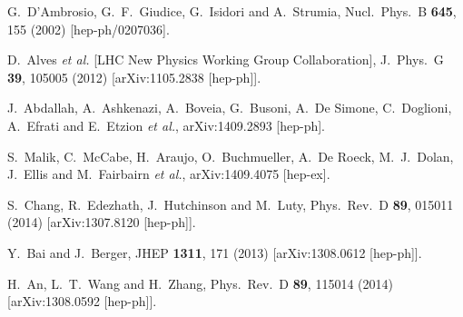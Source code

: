 \begin{thebibliography}{90}


  G.~D'Ambrosio, G.~F.~Giudice, G.~Isidori and A.~Strumia,
  Nucl.\ Phys.\ B {\bf 645}, 155 (2002)
  [hep-ph/0207036].
  

  D.~Alves {\it et al.}  [LHC New Physics Working Group Collaboration],
  J.\ Phys.\ G {\bf 39}, 105005 (2012)
  [arXiv:1105.2838 [hep-ph]].
  
  

  J.~Abdallah, A.~Ashkenazi, A.~Boveia, G.~Busoni, A.~De Simone, C.~Doglioni, A.~Efrati and E.~Etzion {\it et al.},
  arXiv:1409.2893 [hep-ph].
  
  S.~Malik, C.~McCabe, H.~Araujo, O.~Buchmueller, A.~De Roeck, M.~J.~Dolan, J.~Ellis and M.~Fairbairn {\it et al.},
  arXiv:1409.4075 [hep-ex].
  

  S.~Chang, R.~Edezhath, J.~Hutchinson and M.~Luty,
  Phys.\ Rev.\ D {\bf 89}, 015011 (2014)
  [arXiv:1307.8120 [hep-ph]].
  
  Y.~Bai and J.~Berger,
  JHEP {\bf 1311}, 171 (2013)
  [arXiv:1308.0612 [hep-ph]].
  
  H.~An, L.~T.~Wang and H.~Zhang,
  Phys.\ Rev.\ D {\bf 89}, 115014 (2014)
  [arXiv:1308.0592 [hep-ph]].
  

\end{thebibliography}
